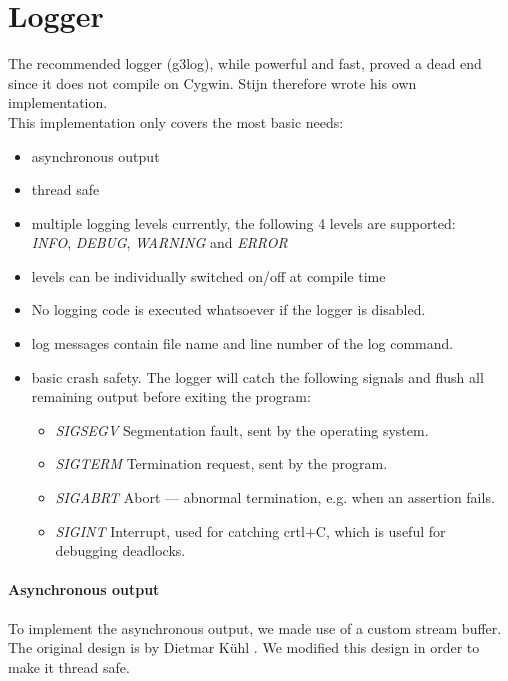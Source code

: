 \documentclass[8pt,a4paper]{report}
\begin{document}
\section{Logger}
The recommended logger (g3log), while powerful and fast, proved a dead end since it does not compile on Cygwin. 
Stijn therefore wrote his own implementation.\\
This implementation only covers the most basic needs:
\begin{itemize}
	\item asynchronous output
	\item thread safe
	\item multiple logging levels currently, the following 4 levels are supported:\\
		\emph{INFO}, \emph{DEBUG}, \emph{WARNING} and \emph{ERROR}
	\item levels can be individually switched on/off at compile time
	\item No logging code is executed whatsoever if the logger is disabled.
	\item log messages contain file name and line number of the log command.
	\item basic crash safety. The logger will catch the following signals and flush all remaining output before exiting the program:
		\begin{itemize}
			\item \emph{SIGSEGV} Segmentation fault, sent by the operating system.
			\item \emph{SIGTERM} Termination request, sent by the program.
			\item \emph{SIGABRT} Abort --- abnormal termination, e.g. when an assertion fails.
			\item \emph{SIGINT} Interrupt, used for catching crtl+C, which is useful for debugging deadlocks.
		\end{itemize}
\end{itemize}

\paragraph{Asynchronous output}
To implement the asynchronous output, we made use of a custom stream buffer. The original design is by Dietmar K{\"u}hl \cite{asynchwrite}. We modified this design in order to make it thread safe.
\end{document}
